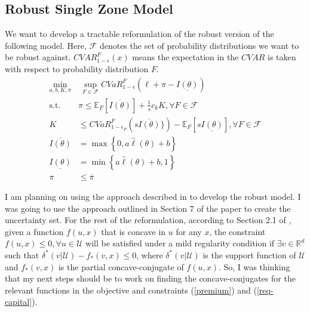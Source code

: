 \documentclass[11pt]{article}
\begin{document}
\subsection{Robust Single Zone Model}
We want to develop a tractable reformulation of the robust version of the following model. Here, $\mathcal{F}$ denotes the set of probability distributions we want to be robust against. $CVAR_{1-\epsilon}^F(x)$ means the expectation in the $CVAR$ is taken with respect to probability distribution $F$. 
\begin{align}
    \min_{a,b,K,\pi} &\ \sup_{F \in \mathcal{F}} CVaR^F_{1-\epsilon} \left ( \ell + \pi  -  \underline{I(\theta)} \right )\\
    \text{s.t.   } & \pi \leq \mathbb{E}_F \left [ \overline{I(\theta)} \right ] + \frac{1}{s}c_k K, \forall F \in \mathcal{F} \label{premium}\\
    K &\leq CVaR^F_{1-\epsilon_P} \left( s\overline{I(\theta)} \} \right) - \mathbb{E}_F \left [ s\underline{I(\theta)} \right ], \forall F \in \mathcal{F} \label{req-capital}\\
    \overline{I(\theta)} &= \max \left \{0,a\hat{\ell}(\theta) + b \right \}\\
    \underline{I(\theta)} &= \min \left \{a\hat{\ell}(\theta)+b,1 \right \}\\
    \pi &\leq \overline{\pi}
\end{align}

I am planning on using the approach described in \cite{bertsimas2018data} to develop the robust model. I was going to use the approach outlined in Section 7 of the paper to create the uncertainty set. For the rest of the reformulation, according to Section 2.1 of \cite{bertsimas2018data}, given a function $f(u,x)$ that is concave in $u$ for any $x$, the constraint $f(u,x) \leq 0, \forall u \in \mathcal{U}$ will be satisfied under a mild regularity condition if $ \exists v \in \mathbb{R}^d$ such that $\delta^*(v|\mathcal{U}) - f_*(v,x) \leq 0$, where $\delta^*(v|\mathcal{U})$ is the support function of $\mathcal{U}$ and $f_*(v,x)$ is the partial concave-conjugate of $f(u,x)$. So, I was thinking that my next steps should be to work on finding the concave-conjugates for the relevant functions in the objective and constraints (\ref{premium}) and (\ref{req-capital}). 
\end{document}
